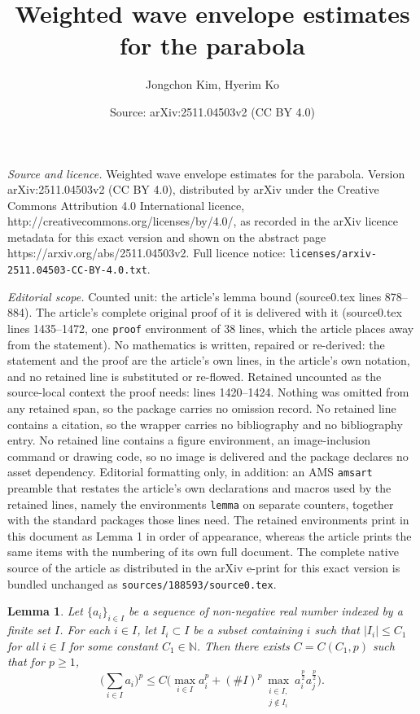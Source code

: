 \documentclass[10pt,a4paper]{amsart}
\title{Weighted wave envelope estimates for the parabola}
\author{Jongchon Kim, Hyerim Ko}
\date{Source: arXiv:2511.04503v2 (CC BY 4.0)}
\newtheorem{lemma}{Lemma}
\newcommand{\N}{\mathbb{N}}
\begin{document}
\maketitle

\noindent\emph{Source and licence.} Weighted wave envelope estimates for the parabola. Version arXiv:2511.04503v2 (CC BY 4.0), distributed by arXiv under the Creative Commons Attribution 4.0 International licence, http://creativecommons.org/licenses/by/4.0/, as recorded in the arXiv licence metadata for this exact version and shown on the abstract page https://arxiv.org/abs/2511.04503v2. Full licence notice: \texttt{licenses/arxiv-2511.04503-CC-BY-4.0.txt}.\par\smallskip

\noindent\textit{Editorial scope.} Counted unit: the article's lemma bound (source0.tex lines 878--884). The article's complete original proof of it is delivered with it (source0.tex lines 1435--1472, one \texttt{proof} environment of 38 lines, which the article places away from the statement). No mathematics is written, repaired or re-derived: the statement and the proof are the article's own lines, in the article's own notation, and no retained line is substituted or re-flowed.  Retained uncounted as the source-local context the proof needs: lines 1420--1424.  Nothing was omitted from any retained span, so the package carries no omission record.  No retained line contains a citation, so the wrapper carries no bibliography and no bibliography entry.  No retained line contains a figure environment, an image-inclusion command or drawing code, so no image is delivered and the package declares no asset dependency.  Editorial formatting only, in addition: an AMS \texttt{amsart} preamble that restates the article's own declarations and macros used by the retained lines, namely the environments \texttt{lemma} on separate counters, together with the standard packages those lines need.  The retained environments print in this document as Lemma 1 in order of appearance, whereas the article prints the same items with the numbering of its own full document.  The complete native source of the article as distributed in the arXiv e-print for this exact version is bundled unchanged as \texttt{sources/188593/source0.tex}.
\begin{lemma}\label{lem:BG} Let $\{ a_i \}_{i\in I}$ be a sequence of non-negative real number indexed by a finite set $I$. For each $i\in I$, let $I_i \subset I$ be a subset containing $i$ such that $|I_i| \leq C_1$ for all $i\in I$ for some 
constant $C_1 \in \N$. Then there exists $C=C(C_1,p)$ such that for $p\ge1$,
\[ 
\Big(\sum_{i\in I} a_i\Big)^p \leq C\Big( \max_{i\in I} a_i^p + (\# I )^p\max_{\substack{i\in I,\\ j\notin I_i}} a_i^{\frac p2} a_j^{\frac p2}\Big). \]
\end{lemma}
\end{document}
